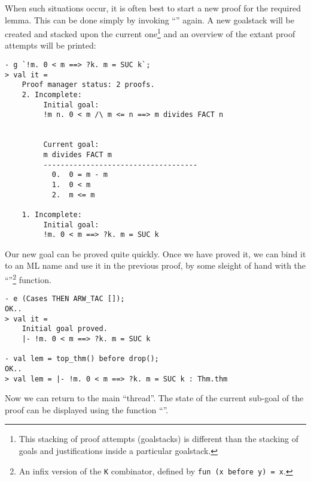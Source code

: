 When such situations occur, it is often best to start a new proof for
the required lemma. This can be done simply by invoking ``''
again. A new goalstack will be created and stacked upon the current
one\footnote{This stacking of proof attempts (goalstacks) is different
  than the stacking of goals and justifications inside a particular
  goalstack.}  and an overview of the extant proof attempts will be
printed:
\begin{session}\begin{verbatim}
- g `!m. 0 < m ==> ?k. m = SUC k`;
> val it =
    Proof manager status: 2 proofs.
    2. Incomplete:
         Initial goal:
         !m n. 0 < m /\ m <= n ==> m divides FACT n


         Current goal:
         m divides FACT m
         ------------------------------------
           0.  0 = m - m
           1.  0 < m
           2.  m <= m

    1. Incomplete:
         Initial goal:
         !m. 0 < m ==> ?k. m = SUC k
\end{verbatim}\end{session}
    Our new goal can be proved quite quickly. Once we have proved it,
    we can bind it to an ML name and use it in the previous proof, by
    some sleight of hand with the ``''\footnote{An infix
      version of the {\tt K} combinator, defined by {\tt fun (x before
        y) = x}.} function.
\begin{session}\begin{verbatim}
- e (Cases THEN ARW_TAC []);
OK..
> val it =
    Initial goal proved.
    |- !m. 0 < m ==> ?k. m = SUC k

- val lem = top_thm() before drop();
OK..
> val lem = |- !m. 0 < m ==> ?k. m = SUC k : Thm.thm
\end{verbatim}\end{session}
    Now we can return to the main ``thread''.  The state of the
    current sub-goal of the proof can be displayed using the function
    ``''.


